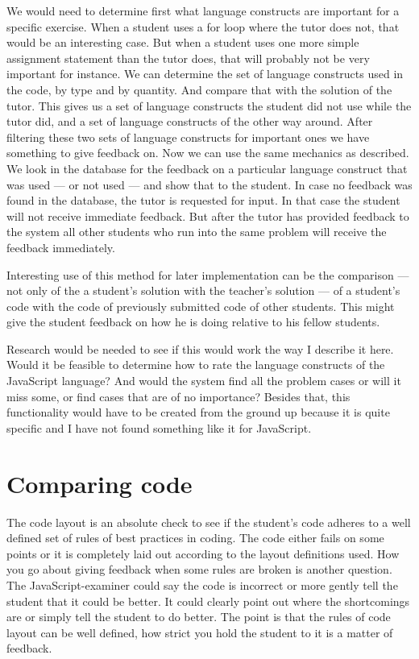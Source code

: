 We would need to determine first what language constructs are important
for a specific exercise.
When a student uses a for loop where the tutor does not,
that would be an interesting case.
But when a student uses one more simple assignment statement than the
tutor does, that will probably not be very important for instance. We can
determine the set of language constructs used in the code, by type and by
quantity. And compare that with the solution of the tutor. This gives us a set
of language constructs the student did not use while the tutor did, and a set
of language constructs of the other way around. After filtering these two sets
of language constructs for important ones we have something to give feedback
on. Now we can use the same mechanics as \citet{watson2011learning}
described. We look in the database for the feedback on a particular language
construct that was used --- or not used --- and show that to the student. In
case no feedback was found in the database, the tutor is requested for input.
In that case the student will not receive immediate feedback.
But after the tutor has provided feedback to the system
all other students who run into the same problem
will receive the feedback immediately.

Interesting use of this method for later implementation can be the comparison
--- not only of the a student's solution with the teacher's solution --- of a
student's code with the code of previously submitted code of other
students. This might give the student feedback on how he is doing relative to
his fellow students.

Research would be needed to see if this would work the way I describe it
here. Would it be feasible to determine how to rate the language constructs of
the JavaScript language? And would the system find all the problem cases or
will it miss some, or find cases that are of no importance?  Besides that, this
functionality would have to be created from the ground up because it is quite
specific and I have not found something like it for JavaScript.

\section{Comparing code}

The code layout is an absolute check to see if the student's code adheres to a
well defined set of rules of best practices in coding. The code either fails on
some points or it is completely laid out according to the layout definitions
used. How you go about giving feedback when some rules are broken is another
question. The JavaScript-examiner could say the code is incorrect or more
gently tell the student that it could be better. It could clearly point out
where the shortcomings are or simply tell the student to do better. The point
is that the rules of code layout can be well defined, how strict you hold the
student to it is a matter of feedback.

